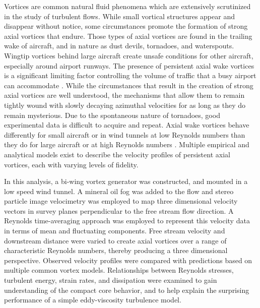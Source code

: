 Vortices are common natural fluid phenomena which are extensively scrutinized 
in the study of turbulent flows. While small vortical structures appear and 
disappear without notice, some circumstances promote the formation of strong 
axial vortices that endure. Those types of axial vortices are found in the 
trailing wake of aircraft, and in nature as dust devils, tornadoes, and 
waterspouts. Wingtip vortices behind large aircraft create unsafe conditions 
for other aircraft, especially around airport runways. The presence of 
persistent axial wake vortices is a significant limiting factor controlling the 
volume of traffic that a busy airport can accommodate \cite{hallock1991}. While 
the circumstances that result 
in the creation of strong axial vortices are well understood, the mechanisms 
that allow them to remain tightly wound with slowly decaying azimuthal 
velocities for as long as they do remain mysterious. 
Due to the spontaneous nature of tornadoes, good experimental data is difficult 
to acquire and repeat. Axial wake vortices behave differently for 
small aircraft or in wind tunnels at low Reynolds numbers than they do for 
large aircraft or at high Reynolds numbers \cite{burnam2013}. Multiple 
empirical and analytical models exist to describe the velocity profiles of 
persistent axial vortices, each with varying levels of fidelity.

In this analysis, a bi-wing vortex generator was constructed, and mounted in 
a low speed wind tunnel. A mineral oil fog was added to the flow and stereo 
particle image velocimetry was employed to map three dimensional velocity 
vectors in survey planes perpendicular to the free stream flow direction. A 
Reynolds time-averaging approach was employed to represent this velocity data 
in terms of mean and fluctuating components. Free stream velocity and 
downstream distance were varied to create axial vortices over a range of 
characteristic Reynolds numbers, thereby producing a three dimensional 
perspective. Observed velocity profiles were compared with predictions based on 
multiple common vortex models. Relationships between 
Reynolds stresses, turbulent energy, strain rates, and dissipation were
examined to gain understanding of the compact core behavior, and to help 
explain the surprising performance of a simple eddy-viscosity turbulence model.